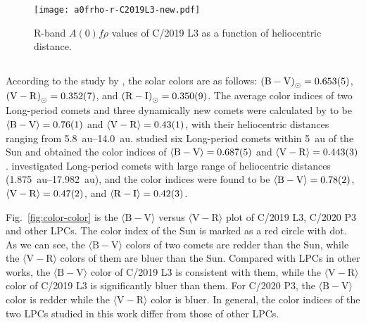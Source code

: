 \begin{figure}
    \centering
    \texttt{[image: a0frho-r-C2019L3-new.pdf]}
    \caption{R-band $A(0)f\rho$ values of C/2019 L3  as a function of heliocentric distance. }\label{fig:a0frho-c2019}
\end{figure}

\subsection{}
According to the study by \cite{ramirez_ubvric_2012}, the solar colors are as follows: 
${(\mathrm{B-V})}_{\odot} = \num{0.653 +- 0.005}$, 
${(\mathrm{V-R})}_{\odot} = \num{0.352 +- 0.007}$, and 
${(\mathrm{R-I})}_{\odot} = \num{0.350 +- 0.009}$. 
The average color indices of two Long-period comets and three dynamically new comets were calculated by \cite{meech_activity_2009} to be 
$\langle \mathrm{B-V} \rangle = \num{0.76 +- 0.01}$ and 
$\langle \mathrm{V-R} \rangle = \num{0.43 +- 0.01}$, 
with their heliocentric distances ranging from \qtyrange{5.8}{14.0}{\astronomicalunit}. 
\cite{solontoi_ensemble_2012} studied six Long-period comets within \qty{5}{\astronomicalunit} of the Sun and obtained the color indices of 
$\langle \mathrm{B-V} \rangle = \num{0.687 +- 0.005}$ and 
$\langle \mathrm{V-R} \rangle = \num{0.443 +- 0.003}$. 
\cite{jewittCOLORSYSTEMATICSCOMETS2015} investigated Long-period comets with large range of heliocentric distances (\qtyrange{1.875}{17.982}{\astronomicalunit}), and the color indices were found to be 
$\langle \mathrm{B-V} \rangle = \num{0.78 +- 0.02}$, 
$\langle \mathrm{V-R} \rangle = \num{0.47 +- 0.02}$, and 
$\langle \mathrm{R-I} \rangle = \num{0.42 +- 0.03}$. 


Fig.~\ref{fig:color-color} is the $\langle \mathrm{B-V} \rangle$ versus $\langle \mathrm{V-R} \rangle$ plot of C/2019 L3, C/2020 P3 and other LPCs. 
The color index of the Sun \citep{ramirez_ubvric_2012} is marked as a red circle with dot. 
As we can see, the $\langle \mathrm{B-V} \rangle$ colors of two comets are redder than the Sun, while the $\langle \mathrm{V-R} \rangle$ colors of them are bluer than the Sun. 
Compared with LPCs in other works, the $\langle \mathrm{B-V} \rangle$ color of C/2019 L3 is consistent with them, while the $\langle \mathrm{V-R} \rangle$ color of C/2019 L3 is significantly bluer than them. For C/2020 P3, the $\langle \mathrm{B-V} \rangle$ color is redder while the $\langle \mathrm{V-R} \rangle$ color is bluer. 
In general, the color indices of the two LPCs studied in this work differ from those of other LPCs. 


